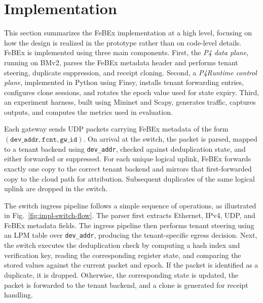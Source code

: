 \section{Implementation}
\label{sec:implementation}

This section summarizes the FeBEx implementation at a high level, focusing on how the design is realized in the prototype rather than on code-level details. FeBEx is implemented using three main components. First, the \textit{P4 data plane}, running on BMv2, parses the FeBEx metadata header and performs tenant steering, duplicate suppression, and receipt cloning. Second, a \textit{P4Runtime control plane}, implemented in Python using Finsy, installs tenant forwarding entries, configures clone sessions, and rotates the epoch value used for state expiry. Third, an experiment harness, built using Mininet and Scapy, generates traffic, captures outputs, and computes the metrics used in evaluation.

Each gateway sends UDP packets carrying FeBEx metadata of the form $(\texttt{dev\_addr}, \texttt{fcnt}, \texttt{gw\_id})$. On arrival at the switch, the packet is parsed, mapped to a tenant backend using \texttt{dev\_addr}, checked against deduplication state, and either forwarded or suppressed. For each unique logical uplink, FeBEx forwards exactly one copy to the correct tenant backend and mirrors that first-forwarded copy to the cloud path for attribution. Subsequent duplicates of the same logical uplink are dropped in the switch.

The switch ingress pipeline follows a simple sequence of operations, as illustrated in Fig.~\ref{fig:impl-switch-flow}. The parser first extracts Ethernet, IPv4, UDP, and FeBEx metadata fields. The ingress pipeline then performs tenant steering using an LPM table over \texttt{dev\_addr}, producing the tenant-specific egress decision. Next, the switch executes the deduplication check by computing a hash index and verification key, reading the corresponding register state, and comparing the stored values against the current packet and epoch. If the packet is identified as a duplicate, it is dropped. Otherwise, the corresponding state is updated, the packet is forwarded to the tenant backend, and a clone is generated for receipt handling.


